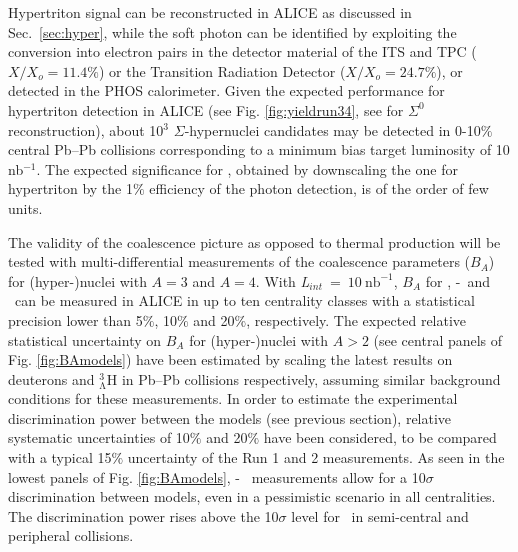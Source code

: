 


Hypertriton signal can be reconstructed in ALICE as discussed in Sec.~\ref{sec:hyper}, while the soft photon can be identified by exploiting the conversion into electron pairs in the detector material of the ITS and TPC ($X/X_o = 11.4 \%$) or the Transition Radiation Detector ($X/X_o = 24.7 \%$), or detected in the PHOS calorimeter.
Given the expected performance for hypertriton detection in ALICE (see Fig. \ref{fig:yieldrun34}, see \cite{Borissov:2015ura} for $\Sigma^{0}$ reconstruction), about 10$^3$ $\Sigma$-hypernuclei candidates may be detected in 0-10$\%$ central Pb--Pb collisions corresponding to a minimum bias target luminosity of 10 nb$^{-1}$. 
The expected significance for \sigmahyp, obtained by downscaling the one for hypertriton by the 1$\%$ efficiency of the photon detection, is of the order of few units. 

The validity of the coalescence picture as opposed to thermal production will be tested with multi-differential measurements of the coalescence parameters ($B_A$) for (hyper-)nuclei with $A=3$ and $A=4$. 
With \textit{L}$_{int}~=~10~\mathrm{nb}^{-1}$, $B_A$ for \hethree, \hyp~and \hefour~can be measured in ALICE in up to ten centrality classes with a statistical precision lower than 5$\%$, 10$\%$ and 20$\%$, respectively. 
The expected relative statistical uncertainty on $B_A$ for (hyper-)nuclei with $A>2$ (see central panels of Fig. \ref{fig:BAmodels}) have been estimated by scaling the latest results on deuterons and $\mathrm{^{3}_{\Lambda}H}$ in Pb--Pb collisions respectively, assuming similar background conditions for these measurements. 
In order to estimate the experimental discrimination power between the models (see previous section), relative systematic uncertainties of 10$\%$ and 20$\%$ have been considered, to be compared with a typical 15$\%$ uncertainty of the Run 1 and 2 measurements. 
As seen in the lowest panels of Fig. \ref{fig:BAmodels}, \hyp~ measurements allow for a 10$\sigma$ discrimination between models, even in a pessimistic scenario in all centralities. The discrimination power rises above the 10$\sigma$ level for \hefour~in semi-central and peripheral collisions.  

